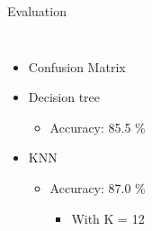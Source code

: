 \begin{frame}{Evaluation}
    \begin{columns}[T, onlytextwidth]
        \begin{itemize}
            \item Confusion Matrix
            \item Decision tree
            \begin{itemize}
                \item Accuracy: 85.5 \%
            \end{itemize}
            \item KNN
            \begin{itemize}
                \item Accuracy: 87.0 \%
                \begin{itemize}
                    \item With K = 12
                \end{itemize}
            \end{itemize}
        \end{itemize}
        
    \end{columns}
\end{frame}